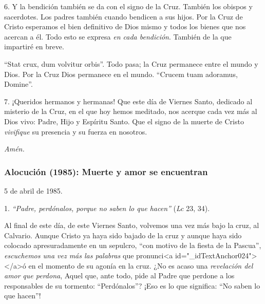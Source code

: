 			\begin{body}6. Y la bendición también se da con el signo de la Cruz. También los obispos y sacerdotes. Los padres también cuando bendicen a sus hijos. Por la Cruz de Cristo esperamos el bien definitivo de Dios mismo y todos los bienes que nos acercan a él. Todo esto se expresa \textit{en cada bendición}. También de la que impartiré en breve. \end{body}
			
			\begin{body}“Stat crux, dum volvitur orbis”. Todo pasa; la Cruz permanece entre el mundo y Dios. Por la Cruz Dios permanece en el mundo. “Crucem tuam adoramus, Domine”. \end{body}
			
			\begin{body}7. ¡Queridos hermanos y hermanas! Que este día de Viernes Santo, dedicado al misterio de la Cruz, en el que hoy hemos meditado, nos acerque cada vez más al Dios vivo: Padre, Hijo y Espíritu Santo. Que el signo de la muerte de Cristo \textit{vivifique} su presencia y su fuerza en nosotros. \end{body}
			
			\begin{body}\textit{Amén.}\end{body}
			
			\subsubsection{Alocución (1985): Muerte y amor se encuentran}
			
			\begin{referencia} 5 de abril de 1985. \end{referencia}
			
			\begin{body}1. \textit{“Padre, perdónalos, porque no saben lo que hacen”} (\textit{Lc }23, 34). \end{body}
			
			\begin{body}Al final de este día, de este Viernes Santo, volvemos una vez más bajo la cruz, al Calvario. Aunque Cristo ya haya sido bajado de la cruz y aunque haya sido colocado apresuradamente en un sepulcro, “con motivo de la fiesta de la Pascua”, \textit{escuchemos una vez más las palabras }que pronunci<a id="_idTextAnchor024"></a>ó en el momento de su agonía en la cruz. ¿No es acaso una \textit{revelación del amor} \textit{que perdona}, Aquel que, ante todo, pide al Padre que perdone a los responsables de su tormento: “Perdónalos”? ¡Eso es lo que significa: “No saben lo que hacen”! \end{body}
			
